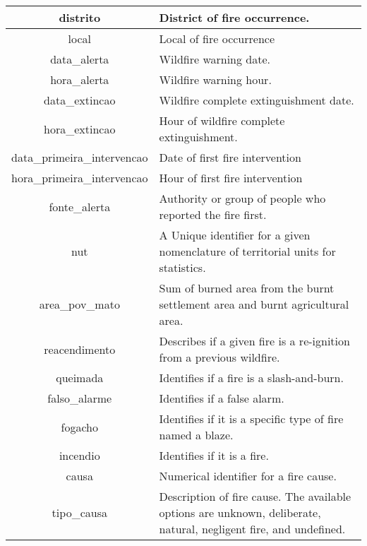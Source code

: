 \begin{table}[h!]
\begin{tabular}{|c|p{7.5cm}|}
distrito  & District of fire occurrence. \\
\hline


local  & Local of fire occurrence \\
\hline


data\_alerta  & Wildfire warning date. \\
\hline
hora\_alerta  & Wildfire warning hour. \\
\hline
data\_extincao & Wildfire complete extinguishment date. \\
\hline
hora\_extincao & Hour of wildfire complete extinguishment. \\
\hline
data\_primeira\_intervencao & Date of first fire intervention \\
\hline
hora\_primeira\_intervencao & Hour of first fire intervention \\
\hline
fonte\_alerta & Authority or group of people who reported the fire first. \\
\hline
nut & A Unique identifier for a given nomenclature of territorial units for statistics. \\
\hline



area\_pov\_mato & Sum of burned area from the burnt settlement area and burnt agricultural area.\\
\hline

reacendimento & Describes if a given fire is a re-ignition from a previous wildfire. \\
\hline
queimada & Identifies if a fire is a slash-and-burn. \\
\hline
falso\_alarme & Identifies if a false alarm. \\
\hline
fogacho & Identifies if it is a specific type of fire named a blaze. \\
\hline
incendio & Identifies if it is a fire. \\
\hline
causa & Numerical identifier for a fire cause. \\
\hline
tipo\_causa & Description of fire cause. The available options are unknown, deliberate, natural, negligent fire, and undefined. \\
\hline
\end{tabular}
\end{table}





